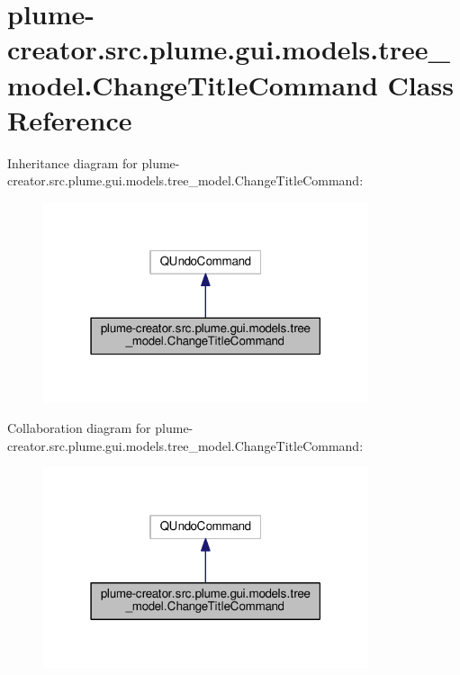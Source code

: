 \hypertarget{classplume-creator_1_1src_1_1plume_1_1gui_1_1models_1_1tree__model_1_1_change_title_command}{}\section{plume-\/creator.src.\+plume.\+gui.\+models.\+tree\+\_\+model.\+Change\+Title\+Command Class Reference}
\label{classplume-creator_1_1src_1_1plume_1_1gui_1_1models_1_1tree__model_1_1_change_title_command}


Inheritance diagram for plume-\/creator.src.\+plume.\+gui.\+models.\+tree\+\_\+model.\+Change\+Title\+Command\+:\nopagebreak
\begin{figure}[H]
\begin{center}
\leavevmode
\includegraphics[width=271pt]{classplume-creator_1_1src_1_1plume_1_1gui_1_1models_1_1tree__model_1_1_change_title_command__inherit__graph}
\end{center}
\end{figure}


Collaboration diagram for plume-\/creator.src.\+plume.\+gui.\+models.\+tree\+\_\+model.\+Change\+Title\+Command\+:\nopagebreak
\begin{figure}[H]
\begin{center}
\leavevmode
\includegraphics[width=271pt]{classplume-creator_1_1src_1_1plume_1_1gui_1_1models_1_1tree__model_1_1_change_title_command__coll__graph}
\end{center}
\end{figure}
